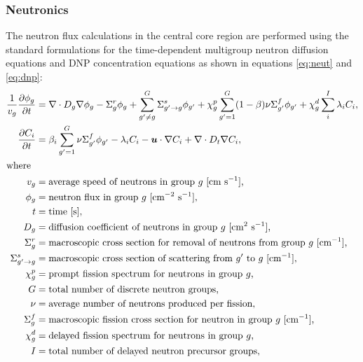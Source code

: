 \subsubsection{Neutronics}

The neutron flux calculations in the central core region are
performed using the standard formulations for the time-dependent multigroup
neutron diffusion equations and \gls{DNP} concentration equations as shown in
equations \ref{eq:neut} and \ref{eq:dnp}:
%
\begin{align}
    \frac{1}{v_g} \frac{\partial \phi_g}{\partial t} &= \nabla \cdot D_g
    \nabla \phi_g - \Sigma^r_g \phi_g +
    \sum^G_{g' \neq g} \Sigma^s_{g' \rightarrow g} \phi_{g'} + \chi^p_g
    \sum^G_{g'=1} (1-\beta) \nu \Sigma^f_{g'} \phi_{g'} + \chi^d_g \sum^I_i
    \lambda_i C_i, \label{eq:neut} \\
    \frac{\partial C_i}{\partial t} &= \beta_i \sum^G_{g'=1} \nu \Sigma^f_{g'}
    \phi_{g'} - \lambda_i C_i - \boldsymbol{u} \cdot \nabla C_i + \nabla \cdot
    D_t \nabla C_i, \label{eq:dnp} \\
    \intertext{where}
    v_g &= \text{average speed of neutrons in group $g$ [cm s$^{-1}$],} 
    \nonumber \\
    \phi_g &= \text{neutron flux in group $g$ [cm$^{-2}$ s$^{-1}$],} \nonumber
    \\
    t &= \text{time [s],} \nonumber \\
    D_g &= \text{diffusion coefficient of neutrons in group $g$ [cm$^2$
    s$^{-1}$],} \nonumber \\
    \Sigma^r_g &= \text{macroscopic cross section for removal of neutrons from
    group $g$ [cm$^{-1}$],} \nonumber \\
    \Sigma^s_{g' \rightarrow g} &= \text{macroscopic cross section of
    scattering from $g'$ to $g$ [cm$^{-1}$],} \nonumber \\
    \chi^p_g &= \text{prompt fission spectrum for neutrons in group $g$,}
    \nonumber \\
    G &= \text{total number of discrete neutron groups,} \nonumber \\
    \nu &= \text{average number of neutrons produced per fission,} \nonumber
    \\
    \Sigma^f_{g} &= \text{macroscopic fission cross section for neutron in
    group $g$ [cm$^{-1}$],} \nonumber \\
    \chi^d_g &= \text{delayed fission spectrum for neutrons in group $g$,}
    \nonumber \\
    I &= \text{total number of delayed neutron precursor groups,} \nonumber \\

\end{align}
